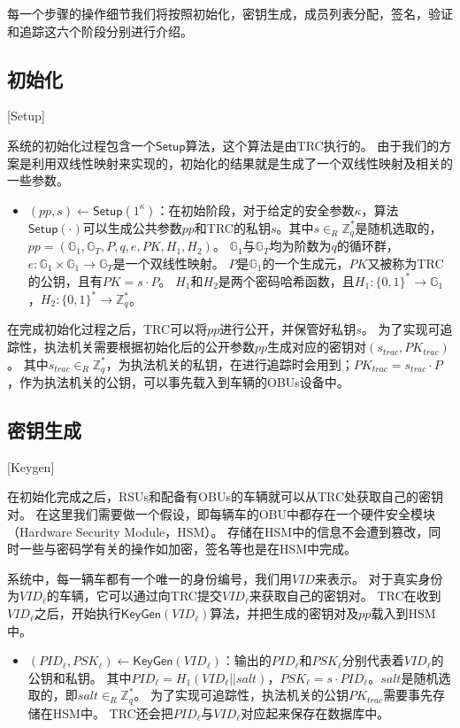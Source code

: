 每一个步骤的操作细节我们将按照初始化，密钥生成，成员列表分配，签名，验证和追踪这六个阶段分别进行介绍。

\subsection{初始化}[Setup]

系统的初始化过程包含一个$\mathsf{Setup}$算法，这个算法是由TRC执行的。
由于我们的方案是利用双线性映射来实现的，初始化的结果就是生成了一个双线性映射及相关的一些参数。
\begin{itemize}
  \item $(pp,s)\leftarrow\mathsf{Setup}(1^\kappa)$：在初始阶段，对于给定的安全参数$\kappa$，算法$\mathsf{Setup}(\cdot)$可以生成公共参数$pp$和TRC的私钥$s$。其中$s\in_R\mathbb{Z}^*_q$是随机选取的，$pp=(\mathbb{G}_1,\mathbb{G}_T,P,q,e,PK,H_1,H_2)$。
  $\mathbb{G}_1$与$\mathbb{G}_T$均为阶数为$q$的循环群，$e:\mathbb{G}_1\times\mathbb{G}_1\rightarrow\mathbb{G}_T$是一个双线性映射。
$P$是$\mathbb{G}_1$的一个生成元，$PK$又被称为TRC的公钥，且有$PK=s\cdot P$。
$H_1$和$H_2$是两个密码哈希函数，且$H_1:\{0,1\}^*\rightarrow\mathbb{G}_1$，$H_2:\{0,1\}^*\rightarrow\mathbb{Z}_q^*$。
\end{itemize}

在完成初始化过程之后，TRC可以将$pp$进行公开，并保管好私钥$s$。
为了实现可追踪性，执法机关需要根据初始化后的公开参数$pp$生成对应的密钥对$(s_{trac},PK_{trac})$。
其中$s_{trac}\in_R\mathbb{Z}_q^*$，为执法机关的私钥，在进行追踪时会用到；$PK_{trac}=s_{trac}\cdot P$，作为执法机关的公钥，可以事先载入到车辆的OBUs设备中。

\subsection{密钥生成}[Keygen]

在初始化完成之后，RSUs和配备有OBUs的车辆就可以从TRC处获取自己的密钥对。
在这里我们需要做一个假设，即每辆车的OBU中都存在一个硬件安全模块（Hardware Security Module，HSM）\cite{tzeng2017enhancing}。
存储在HSM中的信息不会遭到篡改，同时一些与密码学有关的操作如加密，签名等也是在HSM中完成。

系统中，每一辆车都有一个唯一的身份编号，我们用$VID$来表示。
对于真实身份为$VID_\ell$的车辆，它可以通过向TRC提交$VID_\ell$来获取自己的密钥对。
TRC在收到$VID_\ell$之后，开始执行$\mathsf{KeyGen}(VID_\ell)$算法，并把生成的密钥对及$pp$载入到HSM中。

\begin{itemize}
  \item $(PID_\ell,PSK_\ell)\leftarrow\mathsf{KeyGen}(VID_\ell)$：输出的$PID_\ell$和$PSK_\ell$分别代表着$VID_\ell$的公钥和私钥。
  其中$PID_\ell=H_1(VID_\ell||salt)$，$PSK_\ell=s\cdot PID_\ell$。$salt$是随机选取的，即$salt\in_R\mathbb{Z}_q^*$。
  为了实现可追踪性，执法机关的公钥$PK_{trac}$需要事先存储在HSM中。
  TRC还会把$PID_\ell$与$VID_\ell$对应起来保存在数据库中。
\end{itemize}

